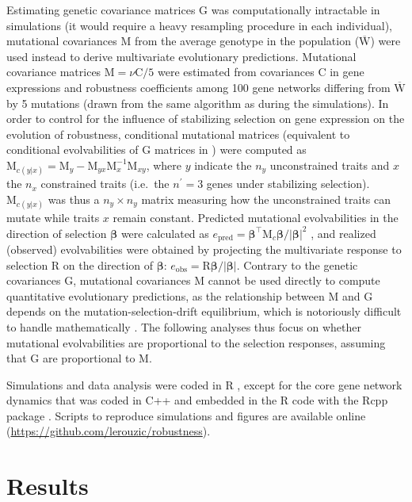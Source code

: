 \documentclass[10pt,a4paper]{article}
\newcommand{\W}{\bm{\mathrm W}}
\newcommand{\M}{\bm{\mathrm M}}
\begin{document}
Estimating genetic covariance matrices $\bm{\mathrm G}$ was computationally intractable in simulations (it would require a heavy resampling procedure in each individual), mutational covariances $\M$ from the average genotype in the population ($\overline{\W}$) were used instead to derive multivariate evolutionary predictions. Mutational covariance matrices $\M = \nu \bm{\mathrm C}/5$ were estimated from covariances $\bm{\mathrm C}$ in gene expressions and robustness coefficients among 100 gene networks differing from $\overline{\W}$ by 5 mutations (drawn from the same algorithm as during the simulations). In order to control for the influence of stabilizing selection on gene expression on the evolution of robustness, conditional mutational matrices (equivalent to conditional evolvabilities of $ \bm{\mathrm G}$ matrices in \cite{HH08}) were computed as $\M_{c(y|x)} =\M_y - \M_{yx} \M_x^{-1} \M_{xy}$, where $y$ indicate the $n_y$ unconstrained traits and $x$ the $n_x$ constrained traits (i.e.\ the $n^\prime = 3$ genes under stabilizing selection). $\M_{c(y|x)}$ was thus a $n_y \times n_y$ matrix measuring how the unconstrained traits can mutate while traits $x$ remain constant. Predicted mutational evolvabilities in the direction of selection $\bm \beta$ were calculated as $e_\mathrm{pred} = \bm\beta^\top \M_c \bm\beta / |\bm\beta|^2$ \citep{HH08}, and realized (observed) evolvabilities were obtained by projecting the multivariate response to selection $\bm{\mathrm R}$ on the direction of $\bm\beta$: $e_\mathrm{obs} = \bm{\mathrm R} \bm\beta / |\bm\beta|$. Contrary to the genetic covariances $\bm{\mathrm G}$, mutational covariances $\M$ cannot be used directly to compute quantitative evolutionary predictions, as the relationship between $\M$ and $\bm{\mathrm G}$ depends on the mutation-selection-drift equilibrium, which is notoriously difficult to handle mathematically \citep{BL94}. The following analyses thus focus on whether mutational evolvabilities are proportional to the selection responses, assuming that $\bm{\mathrm G}$ are proportional to $\M$.  

Simulations and data analysis were coded in R \citep{R20}, except for the core gene network dynamics that was coded in C++ and embedded in the R code with the Rcpp package \citep{EF11}. Scripts to reproduce simulations and figures are available online (\url{https://github.com/lerouzic/robustness}). 

\section{Results}
\end{document}
